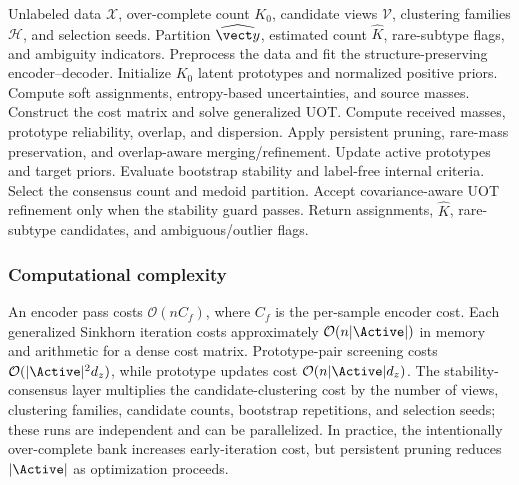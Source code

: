 \begin{algorithm}[t]
\caption{AutoUOT-DC with adaptive UOT and guarded stability consensus}
\label{alg:autouot}
\begin{algorithmic}[1]
\Require Unlabeled data $\mathcal X$, over-complete count $K_0$, candidate views $\mathcal V$, clustering families $\mathcal H$, and selection seeds.
\Ensure Partition $\widehat{\vect y}$, estimated count $\widehat K$, rare-subtype flags, and ambiguity indicators.
\State Preprocess the data and fit the structure-preserving encoder--decoder.
\State Initialize $K_0$ latent prototypes and normalized positive priors.
\Repeat
  \State Compute soft assignments, entropy-based uncertainties, and source masses.
  \State Construct the cost matrix and solve generalized UOT.
  \State Compute received masses, prototype reliability, overlap, and dispersion.
  \State Apply persistent pruning, rare-mass preservation, and overlap-aware merging/refinement.
  \State Update active prototypes and target priors.
  \State Evaluate bootstrap stability and label-free internal criteria.
\EndFor
\State Select the consensus count and medoid partition.
\State Accept covariance-aware UOT refinement only when the stability guard passes.
\State Return assignments, $\widehat K$, rare-subtype candidates, and ambiguous/outlier flags.
\end{algorithmic}
\end{algorithm}

\subsubsection{Computational complexity}
An encoder pass costs $\mathcal O(nC_f)$, where $C_f$ is the per-sample encoder cost. Each generalized Sinkhorn iteration costs approximately $\mathcal O(n|\Active|)$ in memory and arithmetic for a dense cost matrix. Prototype-pair screening costs $\mathcal O(|\Active|^2d_z)$, while prototype updates cost $\mathcal O(n|\Active|d_z)$. The stability-consensus layer multiplies the candidate-clustering cost by the number of views, clustering families, candidate counts, bootstrap repetitions, and selection seeds; these runs are independent and can be parallelized. In practice, the intentionally over-complete bank increases early-iteration cost, but persistent pruning reduces $|\Active|$ as optimization proceeds.

